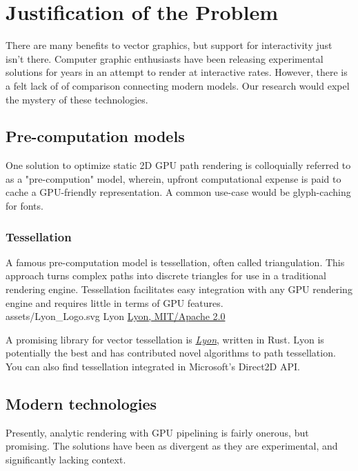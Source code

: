 \section{Justification of the Problem}

There are many benefits to vector graphics, but support for interactivity just isn't there. Computer graphic enthusiasts have been releasing experimental solutions for years in an attempt to render at interactive rates. However, there is a felt lack of of comparison connecting modern models. Our research would expel the mystery of these technologies.\\

\subsection{Pre-computation models}

One solution to optimize static 2D GPU path rendering is colloquially referred to as a "pre-compution" model, wherein, upfront computational expense is paid to cache a GPU-friendly representation. A common use-case would be glyph-caching for fonts.

\subsubsection{Tessellation}

A famous pre-computation model is tessellation, often called triangulation. This approach turns complex paths into discrete triangles for use in a traditional rendering engine. Tessellation facilitates easy integration with any GPU rendering engine and requires little in terms of GPU features.\\

\smallsvg
{assets/Lyon_Logo.svg}
{Lyon}
{\href{https://github.com/nical/lyon}{Lyon, MIT/Apache 2.0}}

A promising library for vector tessellation is \href{https://github.com/nical/lyon}{\textit{Lyon}}, written in Rust. Lyon is potentially the best and has contributed novel algorithms to path tessellation\cite{Lyon}. You can also find tessellation integrated in Microsoft's Direct2D API\cite{D2D_Tess}.

\subsection{Modern technologies}

Presently, analytic rendering with GPU pipelining is fairly onerous, but promising. The solutions have been as divergent as they are experimental, and significantly lacking context.\\

